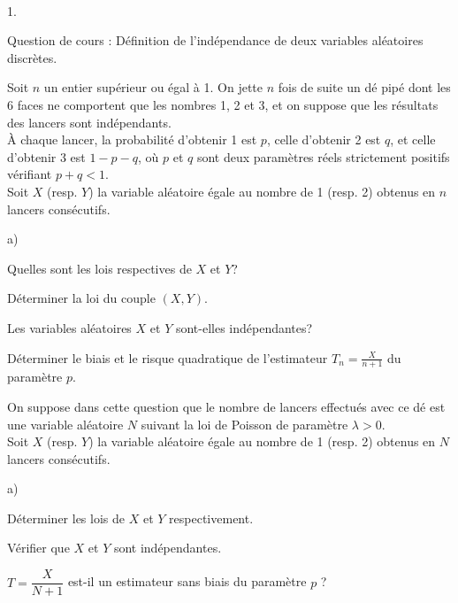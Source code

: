 \documentclass[11pt]{article}%
\begin{document}
\begin{exerciceAP}~
  \begin{noliste}{1.}
    \setlength{\itemsep}{2mm}
  \item Question de cours : Définition de l'indépendance de deux
    variables aléatoires discrètes.

  \item Soit $n$ un entier supérieur ou égal à 1. On jette $n$ fois de
    suite un dé pipé dont les 6 faces ne comportent que les nombres 1,
    2 et 3, et on suppose que les résultats des lancers sont
    indépendants.\\[.2cm]
    À chaque lancer, la probabilité d'obtenir 1 est $p$, celle
    d'obtenir 2 est $q$, et celle d'obtenir 3 est $1-p-q$, où $p$ et
    $q$ sont deux paramètres réels strictement positifs vérifiant
    $p+q<1$.\\

    Soit $X$ (resp. $Y$) la variable aléatoire égale au nombre de 1
    (resp. 2) obtenus en $n$ lancers consécutifs. 
    \begin{noliste}{a)}
    \setlength{\itemsep}{2mm}
    \item Quelles sont les lois respectives de $X$ et $Y$?
    \item Déterminer la loi du couple $(X,Y)$.
    \item Les variables aléatoires $X$ et $Y$ sont-elles indépendantes?
    \item Déterminer le biais et le risque quadratique de l'estimateur
      $T_n = \frac{ X }{ n+1 }$ du paramètre $p$.
    \end{noliste}

  \item On suppose dans cette question que le nombre de lancers
    effectués avec ce dé est une variable aléatoire $N$ suivant la loi
    de Poisson de paramètre $\lambda > 0$.\\

    Soit $X$ (resp. $Y$) la variable aléatoire égale au nombre de 1
    (resp. 2) obtenus en $N$ lancers consécutifs. 
    \begin{noliste}{a)}
    \setlength{\itemsep}{2mm}
    \item Déterminer les lois de $X$ et $Y$ respectivement.
    \item Vérifier que $X$ et $Y$ sont indépendantes.
    \item $T = \dfrac{ X }{ N + 1 }$ est-il un estimateur sans biais du
      paramètre $p$ ?
    \end{noliste}
  \end{noliste}
\end{exerciceAP}
\end{document}
